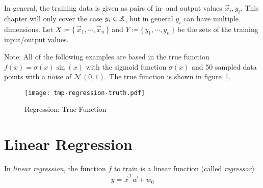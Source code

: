 	In general, the training data is given as pairs of in- and output values \( \vec{x}_i, y_i \). This chapter will only cover the case \( y_i \in \mathbb{R} \), but in general \(y_i\) can have multiple dimensions. Let \( X \coloneqq \{\, \vec{x}_1, \cdots, \vec{x}_n \,\} \) and \( Y \coloneqq \{\, y_1, \cdots, y_n \,\} \) be the sets of the training input/output values.

	Note: All of the following examples are based in the true function \( f(x) = \sigma(x) \sin(x) \) with the sigmoid function \( \sigma(x) \) and 50 sampled data points with a noise of \( \mathcal{N}\,(0, 1) \). The true function is shown in figure~\ref{fig:regressionTrue}.
	
	\begin{figure}
		\centering
		\texttt{[image: tmp-regression-truth.pdf]}
		\caption{Regression: True Function}
		\label{fig:regressionTrue}
	\end{figure}

	\section{Linear Regression}
		In \emph{linear regression}, the function \(f\) to train is a linear function (called \emph{regressor})
		\begin{equation}
			y = \vec{x}^T \vec{w} + w_0
		\end{equation}

